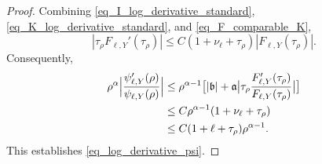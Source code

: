\documentclass[12pt]{amsart}
\begin{document}
\begin{proof}
Combining \eqref{eq_I_log_derivative_standard}, \eqref{eq_K_log_derivative_standard}, and \eqref{eq_F_comparable_K},
\begin{equation*}
    |\tau_\rho F_{\ell,Y}'(\tau_\rho)|
    \le
    C(1+\nu_\ell+\tau_\rho) |F_{\ell,Y}(\tau_\rho)|.
\end{equation*}
Consequently,
\begin{equation}\label{eq:normal2}
\begin{aligned}
    \rho^\alpha
    \Bigl|
        \frac{\psi_{\ell,Y}'(\rho)}{\psi_{\ell,Y}(\rho)}
    \Bigr|
    &\le
    \rho^{\alpha-1}
    \bigl[
        |\mathfrak b|
        +
        \mathfrak a
        \bigl|
            \tau_\rho\frac{F_{\ell,Y}'(\tau_\rho)}{F_{\ell,Y}(\tau_\rho)}
        \bigr|
    \bigr]                                                \\
    &\le
    C\rho^{\alpha-1}(1+\nu_\ell+\tau_\rho)                    \\
    &\le C(1+\ell+\tau_\rho) \rho^{\alpha-1}.
\end{aligned}
\end{equation}
This establishes \eqref{eq_log_derivative_psi}.


\end{proof}
\end{document}

